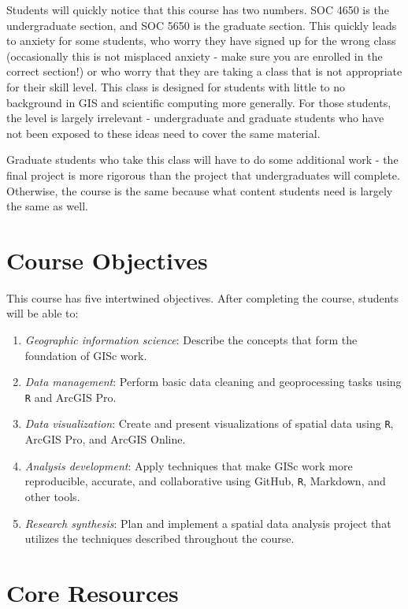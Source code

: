 \documentclass[
]{book}
\begin{document}
Students will quickly notice that this course has two numbers. SOC 4650 is the undergraduate section, and SOC 5650 is the graduate section. This quickly leads to anxiety for some students, who worry they have signed up for the wrong class (occasionally this is not misplaced anxiety - make sure you are enrolled in the correct section!) or who worry that they are taking a class that is not appropriate for their skill level. This class is designed for students with little to no background in GIS and scientific computing more generally. For those students, the level is largely irrelevant - undergraduate and graduate students who have not been exposed to these ideas need to cover the same material.

Graduate students who take this class will have to do some additional work - the final project is more rigorous than the project that undergraduates will complete. Otherwise, the course is the same because what content students need is largely the same as well.

\hypertarget{course-objectives}{%
\section{Course Objectives}\label{course-objectives}}

This course has five intertwined objectives. After completing the course, students will be able to:

\begin{enumerate}
\def\labelenumi{\arabic{enumi}.}
\item
  \emph{Geographic information science}: Describe the concepts that form the foundation of GISc work.
\item
  \emph{Data management}: Perform basic data cleaning and geoprocessing tasks using \texttt{R} and ArcGIS Pro.
\item
  \emph{Data visualization}: Create and present visualizations of spatial data using \texttt{R}, ArcGIS Pro, and ArcGIS Online.
\item
  \emph{Analysis development}: Apply techniques that make GISc work more reproducible, accurate, and collaborative using GitHub, \texttt{R}, Markdown, and other tools.
\item
  \emph{Research synthesis}: Plan and implement a spatial data analysis project that utilizes the techniques described throughout the course.
\end{enumerate}

\hypertarget{core-resources}{%
\section{Core Resources}\label{core-resources}}
\end{document}
